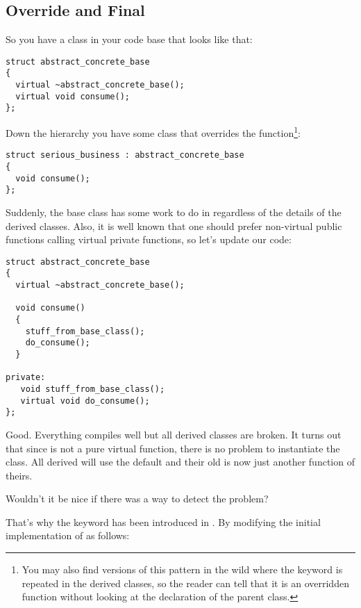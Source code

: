 \subsection{Override and Final}

So you have a class in your  code base that looks like that:

\begin{lstlisting}
struct abstract_concrete_base
{
  virtual ~abstract_concrete_base();
  virtual void consume();
};
\end{lstlisting}

Down the hierarchy you have some class that overrides the
 function\footnote{You may also find versions of this
  pattern in the wild where the  keyword is repeated in
  the derived classes, so the reader can tell that it is an overridden
  function without looking at the declaration of the parent class.}:

\begin{lstlisting}
struct serious_business : abstract_concrete_base
{
  void consume();
};
\end{lstlisting}

Suddenly, the base class has some work to do in 
regardless of the details of the derived classes. Also, it is well
known that one should prefer non-virtual public functions calling
virtual private functions, so let's update our code:

\begin{lstlisting}
struct abstract_concrete_base
{
  virtual ~abstract_concrete_base();

  void consume()
  {
    stuff_from_base_class();
    do_consume();
  }

private:
   void stuff_from_base_class();
   virtual void do_consume();
};
\end{lstlisting}

Good. Everything compiles well but all derived classes are broken. It
turns out that since  is not a pure virtual
function, there is no problem to instantiate the class. All derived
will use the default  and their old
 is now just another function of theirs.

Wouldn't it be nice if there was a way to detect the problem?

\medskip

That's why the  keyword has been introduced in
. By modifying the initial implementation of
 as follows:

